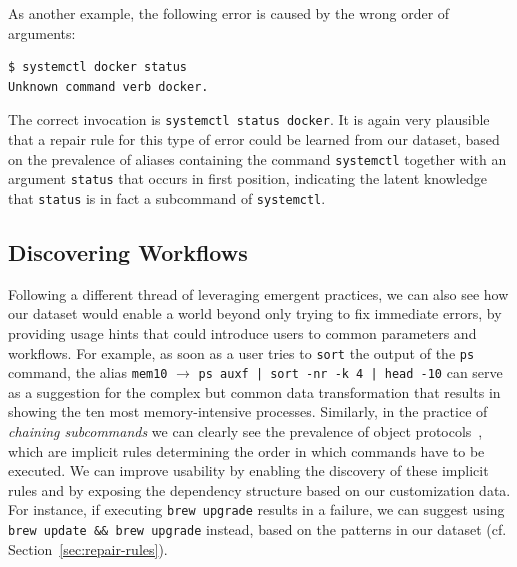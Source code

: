 \documentclass[smallextended,natbib]{svjour3}
\newcommand{\num}[1]{\numprint{#1}}
\newcommand{\alias}[2]{{\texttt{#1} $\rightarrow$ \texttt{#2}}}
\newcommand{\cmd}[1]{{\texttt{#1}}}
\begin{document}
As another example, the following error is caused by the wrong order of arguments:
\begin{Verbatim}
$ systemctl docker status
Unknown command verb docker.
\end{Verbatim}
The correct invocation is \texttt{systemctl status docker}.
It is again very plausible that a repair rule for this type of error could be learned from our dataset, based on the prevalence of aliases containing the command \cmd{systemctl} together with an argument \texttt{status} that occurs in first position,
indicating the latent knowledge that \texttt{status} is in fact a subcommand of \cmd{systemctl}.

\subsection{Discovering Workflows}
\label{sec:discovering-workflows}

Following a different thread of leveraging emergent practices, we can also see how our dataset would enable a world beyond only trying to fix immediate errors, by providing usage hints that could introduce users to common parameters and workflows.
For example, as soon as a user tries to \cmd{sort} the output of the \cmd{ps} command, the alias \alias{mem10}{ps auxf | sort -nr -k 4 | head -10} can serve as a suggestion for the complex but common data transformation that results in showing the ten most memory-intensive processes.
Similarly, in the practice of \emph{chaining subcommands} we can clearly see the prevalence of object protocols~\citep{beckman:11}, which are implicit rules determining the order in which commands have to be executed.
We can improve usability by enabling the discovery of these implicit rules and by exposing the dependency structure based on our customization data.
For instance, if executing \verb|brew upgrade| results in a failure, we can suggest using \verb|brew update && brew upgrade| instead, based on the patterns in our dataset (cf. Section~\ref{sec:repair-rules}).
\end{document}
